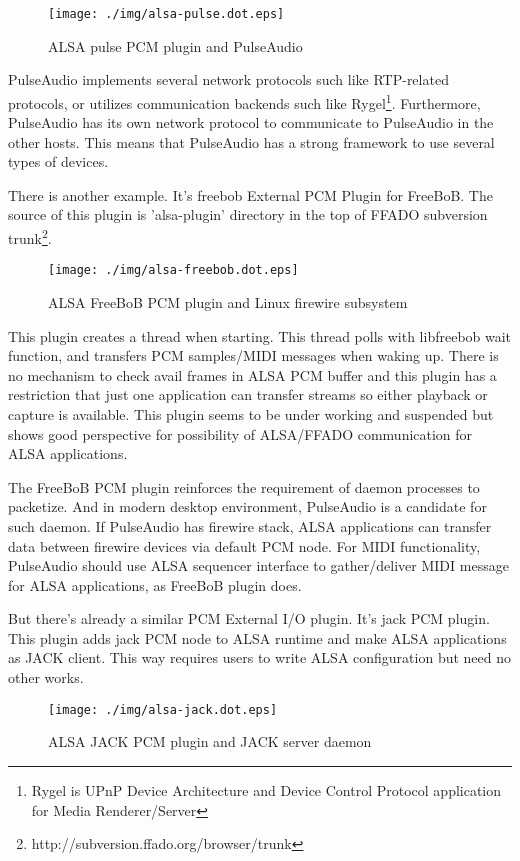 \documentclass[onecolumn]{article}
\begin{document}
\begin{figure}[H]
	\centering
	\texttt{[image: ./img/alsa-pulse.dot.eps]}
	\caption{ALSA pulse PCM plugin and PulseAudio}
	\label{alsa-pulse}
\end{figure}

PulseAudio implements several network protocols such like RTP-related protocols, or utilizes communication backends such like Rygel\footnote{Rygel is UPnP Device Architecture and Device Control Protocol application for Media Renderer/Server}. Furthermore, PulseAudio has its own network protocol to communicate to PulseAudio in the other hosts. This means that PulseAudio has a strong framework to use several types of devices.

There is another example. It's freebob External PCM Plugin for FreeBoB. The source of this plugin is 'alsa-plugin' directory in the top of FFADO subversion trunk\footnote{http://subversion.ffado.org/browser/trunk}.

\begin{figure}[H]
	\centering
	\texttt{[image: ./img/alsa-freebob.dot.eps]}
	\caption{{ALSA FreeBoB PCM plugin and Linux firewire subsystem}}
	\label{alsa_freebob}
\end{figure}

This plugin creates a thread when starting. This thread polls with libfreebob wait function, and transfers PCM samples/MIDI messages when waking up. There is no mechanism to check avail frames in ALSA PCM buffer and this plugin has a restriction that just one application can transfer streams so either playback or capture is available. This plugin seems to be under working and suspended but shows good perspective for possibility of ALSA/FFADO communication for ALSA applications.

The FreeBoB PCM plugin reinforces the requirement of daemon processes to packetize. And in modern desktop environment, PulseAudio is a candidate for such daemon. If PulseAudio has firewire stack, ALSA applications can transfer data between firewire devices via default PCM node. For MIDI functionality, PulseAudio should use ALSA sequencer interface to gather/deliver MIDI message for ALSA applications, as FreeBoB plugin does.

But there's already a similar PCM External I/O plugin. It's jack PCM plugin. This plugin adds jack PCM node to ALSA runtime and make ALSA applications as JACK client. This way requires users to write ALSA configuration but need no other works.

\begin{figure}[H]
	\centering
	\texttt{[image: ./img/alsa-jack.dot.eps]}
	\caption{{ALSA JACK PCM plugin and JACK server daemon}}
	\label{alsa_jack}
\end{figure}
\end{document}
